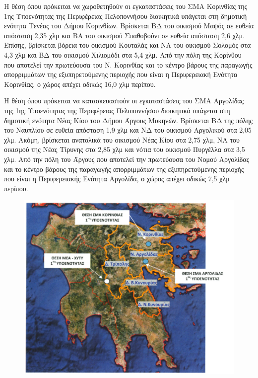 \documentclass[12pt]{article}
\begin{document}
	Η θέση όπου πρόκειται να χωροθετηθούν οι εγκαταστάσεις του ΣΜΑ Κορινθίας της 1ης  Υποενότητας της Περιφέρειας Πελοποννήσου διοικητικά υπάγεται στη δημοτική ενότητα Τενέας του Δήμου Κορινθίων. Βρίσκεται ΒΔ του οικισμού Μαψός σε ευθεία απόσταση 2,35 χλμ και ΒΑ του οικισμού Σπαθοβούνι σε ευθεία απόσταση 2,6 χλμ. Επίσης, βρίσκεται βόρεια του οικισμού Κουταλάς και ΝΑ του οικισμού Σολομός στα 4,3 χλμ και ΒΔ του οικισμού Χιλιομόδι στα 5,4 χλμ. Από την πόλη της Κορίνθου που αποτελεί την πρωτεύουσα του Ν. Κορινθίας και το κέντρο βάρους της παραγωγής απορριμμάτων της εξυπηρετούμενης περιοχής που είναι η Περιφερειακή Ενότητα Κορινθίας, ο χώρος απέχει οδικώς 16,0 χλμ περίπου.
	
	Η θέση όπου πρόκειται να κατασκευαστούν οι εγκαταστάσεις του ΣΜΑ Αργολίδας της  1ης  Υποενότητας της Περιφέρειας Πελοποννήσου διοικητικά υπάγεται στη δημοτική ενότητα Νέας Κίου του Δήμου Άργους Μυκηνών. Βρίσκεται ΒΔ της πόλης του Ναυπλίου σε ευθεία απόσταση 1,9 χλμ και ΝΔ του οικισμού Αργολικού στα 2,05 χλμ. Ακόμη, βρίσκεται ανατολικά του οικισμού Νέας Κίου στα 2,75 χλμ, ΝΑ του οικισμού της Νέας Τίρυνης στα 2,85 χλμ και νότια του οικισμού Πυργέλλα στα 3,5 χλμ. Από την πόλη του Άργους που αποτελεί την πρωτεύουσα του Νομού Αργολίδας και το κέντρο βάρους της παραγωγής απορριμμάτων της εξυπηρετούμενης περιοχής που είναι η Περιφερειακής Ενότητα Αργολίδα, ο χώρος απέχει οδικώς 7,5 χλμ περίπου.
	
	\begin{figure} [H]
		\begin{center}
			\includegraphics [scale = 0.40] {map1.png}
		\end{center}
	\end{figure}
\end{document}
